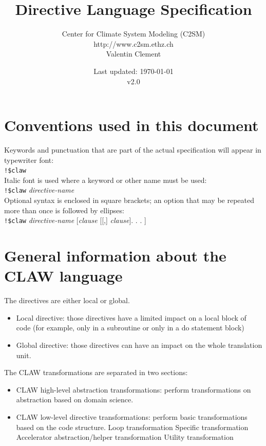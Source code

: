 \documentclass{article}
\title{\LARGE Directive Language Specification}
\author{
  Center for Climate System Modeling (C2SM)\\
  http://www.c2sm.ethz.ch\\
  Valentin Clement
}
\date{Last updated: \today \\\vspace{1em}v2.0}
\begin{document}
\maketitle

\tableofcontents

\section*{Conventions used in this document}

Keywords and punctuation that are part of the actual specification will appear
in typewriter font: \\

\lstinline|!$claw|\\

Italic font is used where a keyword or other name must be used: \\

\lstinline|!$claw| \textit{directive-name}\\

Optional syntax is enclosed in square brackets; an option that may be repeated
more than once is followed by ellipses:\\

\lstinline|!$claw| \textit{directive-name} [\textit{clause}
[[,] \textit{clause}]. . . ]

\section{General information about the CLAW language}
The directives are either local or global.

\begin{itemize}
\item Local directive: those directives have a limited impact on a local block
of code (for example, only in a subroutine or only in a do statement block)
\item Global directive: those directives can have an impact on the whole
translation unit.
\end{itemize}

The CLAW transformations are separated in two sections:
\begin{itemize}
\item CLAW high-level abstraction transformations: perform transformations
on abstraction based on domain science.
\item CLAW low-level directive transformations: perform basic transformations
based on the code structure.
\subitem Loop transformation
\subitem Specific transformation
\subitem Accelerator abstraction/helper transformation
\subitem Utility transformation
\end{itemize}
\end{document}
